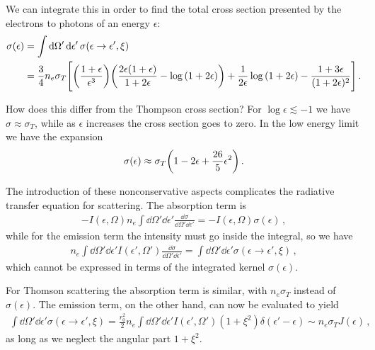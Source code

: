 \documentclass[main.tex]{subfiles}
\begin{document}
We can integrate this in order to find the total cross section presented by the electrons to photons of an energy \(\epsilon \): 
%
\begin{align}
\sigma (\epsilon ) &= \int \dd{\Omega '} \dd{\epsilon '} \sigma (\epsilon \to \epsilon ', \xi ) \\
&= \frac{3}{4} n_e \sigma_{T} \qty[ \qty(\frac{1 + \epsilon }{\epsilon^3}) 
\qty(\frac{2 \epsilon (1 + \epsilon )}{1 + 2 \epsilon }- \log \qty(1 + 2 \epsilon ))
+ 
\frac{1}{2 \epsilon } \log \qty(1 + 2 \epsilon )
- 
\frac{1 + 3 \epsilon }{(1 + 2 \epsilon )^2}
]
\,.
\end{align}

How does this differ from the Thompson cross section? For \(\log \epsilon \lesssim -1 \) we have \(\sigma \approx \sigma_T\), while as \(\epsilon \) increases the cross section goes to zero. 
In the low energy limit we have the expansion 
%
\begin{align}
\sigma (\epsilon )\approx \sigma_T \qty(1 -2 \epsilon + \frac{26}{5} \epsilon^2)
\,.
\end{align}

The introduction of these nonconservative aspects complicates the radiative transfer equation for scattering.
The absorption term is 
%
\begin{align}
- I (\epsilon , \Omega ) n_e \int \dd{\Omega }' \dd{\epsilon }' \frac{ \dd{\sigma }}{ \dd{\Omega }' \dd{\epsilon }' } =     - I (\epsilon , \Omega  ) \sigma (\epsilon )
\,,
\end{align}
%
while for the emission term the intensity must go inside the integral, so we have 
%
\begin{align}
n_e \int \dd{\Omega }' \dd{\epsilon '} I(\epsilon ', \Omega ') \frac{ \dd{\sigma }}{ \dd{\Omega }' \dd{\epsilon }' } = \int \dd{\Omega }' \dd{\epsilon }' \sigma (\epsilon \to \epsilon ', \xi )
\,,
\end{align}
%
which cannot be expressed in terms of the integrated kernel \(\sigma (\epsilon )\). 

For Thomson scattering the absorption term is similar, with \(n_e \sigma_T\) instead of \(\sigma (\epsilon )\). 
The emission term, on the other hand, can now be evaluated to yield  
%
\begin{align}
\int \dd{\Omega }' \dd{\epsilon }' \sigma (\epsilon \to \epsilon ', \xi )
= \frac{r_0^2}{2} n_e \int \dd{\Omega '} \dd{\epsilon '} I(\epsilon ', \Omega ') (1 + \xi^2) \delta (\epsilon ' - \epsilon ) \sim n_e \sigma_T J(\epsilon )
\,,
\end{align}
%
as long as we neglect the angular part \(1 + \xi^2\). 
\end{document}
